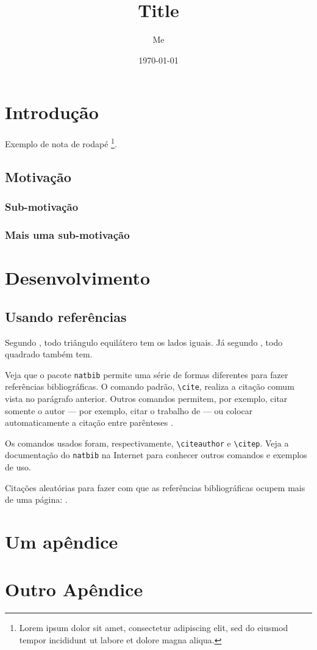 \documentclass{ppgccufmg}
\title{Title}
\date{\today}
\author{Me}
\begin{document}
	\ppgccufmg
	
	\chapter{Introdução}
		Exemplo de nota de rodapé \footnote{Lorem ipsum dolor sit amet, consectetur adipiscing elit, sed do eiusmod tempor incididunt ut labore et dolore magna aliqua.}.
		\lipsum[1-4]
		
		\section{Motivação}
			\lipsum[4-5]
			   
			\subsection{Sub-motivação}
				\lipsum[6-7]
			\subsection{Mais uma sub-motivação}
				\lipsum[8-9]
				
	\chapter{Desenvolvimento}
		\lipsum[1-5]

		\section{Usando referências}
			Segundo \cite{horn86robot}, todo triângulo equilátero tem os lados iguais. Já segundo \cite{shashua97photometric}, todo quadrado também tem.
			
			Veja que o pacote \verb|natbib| permite uma série de formas diferentes para fazer referências bibliográficas. O comando padrão, \verb|\cite|, realiza a citação comum vista no parágrafo anterior. Outros comandos permitem, por exemplo, citar somente o autor --- por exemplo, citar o trabalho de	\citeauthor{samaras99coupled} --- ou colocar automaticamente a citação entre	parênteses \citep{hougen93estimation, sato99illumination2, sato99illumination1, sato01stability}.
			
			Os comandos usados foram, respectivamente, \verb|\citeauthor| e \verb|\citep|. Veja a documentação do \verb|natbib| na Internet para conhecer	outros comandos e exemplos de uso.
			
			Citações aleatórias para fazer com que as referências bibliográficas ocupem	mais de uma página: \cite{bichsel92simple, dror01statistics, guisser92new, dwork2006calibrating, sweeney2002k}.
			
		
		
		
		\begin{apendices}
			\chapter{Um apêndice}
				\lipsum[1-3]
				
			\chapter{Outro Apêndice}
				\lipsum[4-6]
				
		\end{apendices}
		
\end{document}

